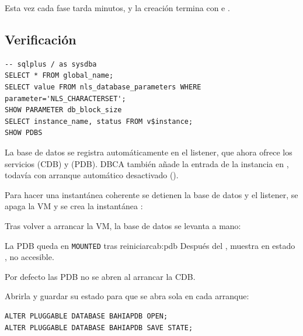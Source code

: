 Esta vez cada fase tarda minutos, y la creación termina con
 e
.

\subsection{Verificación}

\begin{lstlisting}[style=sql]
-- sqlplus / as sysdba
SELECT * FROM global_name;
SELECT value FROM nls_database_parameters WHERE parameter='NLS_CHARACTERSET';
SHOW PARAMETER db_block_size
SELECT instance_name, status FROM v$instance;
SHOW PDBS
\end{lstlisting}


La base de datos se registra automáticamente en el listener, que ahora ofrece
los servicios  (CDB) y  (PDB). DBCA también
añade la entrada de la instancia en , todavía con arranque
automático desactivado ().


Para hacer una instantánea coherente se detienen la base de datos y el listener,
se apaga la VM y se crea la instantánea :


Tras volver a arrancar la VM, la base de datos se levanta a mano:


\begin{cabezazo}[unbreakable]{La PDB queda en \texttt{MOUNTED} tras reiniciar}{cab:pdb}
\problema Después del ,  muestra
 en estado , no accesible.

\causa Por defecto las PDB no se abren al arrancar la CDB.

\solucion Abrirla y guardar su estado para que se abra sola en cada
arranque:

\begin{lstlisting}[style=sql]
ALTER PLUGGABLE DATABASE BAHIAPDB OPEN;
ALTER PLUGGABLE DATABASE BAHIAPDB SAVE STATE;
\end{lstlisting}
\end{cabezazo}

